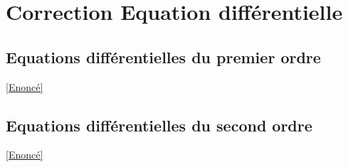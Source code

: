 \documentclass{book}
\begin{document}
\section{Correction Equation différentielle}
	\subsection{Equations différentielles du premier ordre}
	\label{sec:equations-differentielles-du-premier-ordre}
	\textcolor{blue}{\hyperref[Equations différentielles du premier ordre]{[Enoncé]}}\\
	
	\subsection{Equations différentielles du second ordre}
	\label{sec:equations-differentielles-du-second-ordre}
	\textcolor{blue}{\hyperref[Equations différentielles du second ordre]{[Enoncé]}}\\
	
\end{document}
